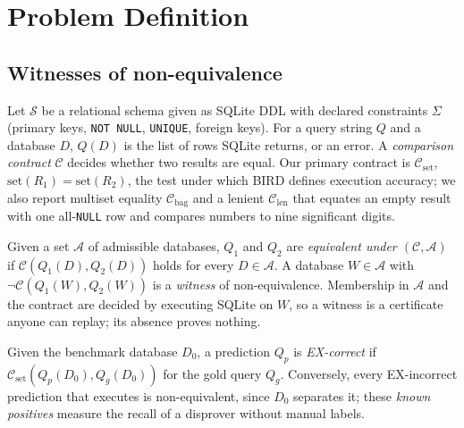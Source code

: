 \section{Problem Definition}\label{sec:problem}

\subsection{Witnesses of non-equivalence}
Let $\mathcal S$ be a relational schema given as SQLite DDL with declared constraints $\Sigma$ (primary keys, \texttt{NOT NULL}, \texttt{UNIQUE}, foreign keys). For a query string $Q$ and a database $D$, $Q(D)$ is the list of rows SQLite returns, or an error. A \emph{comparison contract} $\mathcal C$ decides whether two results are equal. Our primary contract is $\mathcal C_{\mathrm{set}}$, $\mathrm{set}(R_1)=\mathrm{set}(R_2)$, the test under which BIRD defines execution accuracy; we also report multiset equality $\mathcal C_{\mathrm{bag}}$ and a lenient $\mathcal C_{\mathrm{len}}$ that equates an empty result with one all-\texttt{NULL} row and compares numbers to nine significant digits.

Given a set $\mathcal A$ of admissible databases, $Q_1$ and $Q_2$ are \emph{equivalent under $(\mathcal C,\mathcal A)$} if $\mathcal C(Q_1(D),Q_2(D))$ holds for every $D\in\mathcal A$. A database $W\in\mathcal A$ with $\neg\mathcal C(Q_1(W),Q_2(W))$ is a \emph{witness} of non-equivalence. Membership in $\mathcal A$ and the contract are decided by executing SQLite on $W$, so a witness is a certificate anyone can replay; its absence proves nothing.

Given the benchmark database $D_0$, a prediction $Q_p$ is \emph{EX-correct} if $\mathcal C_{\mathrm{set}}(Q_p(D_0),Q_g(D_0))$ for the gold query $Q_g$. Conversely, every EX-incorrect prediction that executes is non-equivalent, since $D_0$ separates it; these \emph{known positives} measure the recall of a disprover without manual labels.

